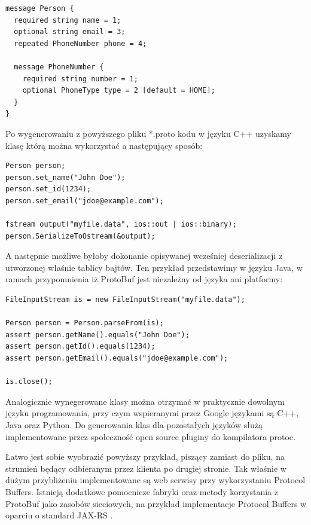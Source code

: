 \begin{lstlisting}[label={proto_simple_sam}]
message Person {
  required string name = 1;
  optional string email = 3;
  repeated PhoneNumber phone = 4;

  message PhoneNumber {
    required string number = 1;
    optional PhoneType type = 2 [default = HOME];
  }
}
\end{lstlisting}

Po wygenerowaniu z powyższego pliku *.proto kodu w języku C++ uzyskamy klasę którą można wykorzystać a następujący sposób:

\begin{lstlisting}[caption={Przykład klasy ProtoBuf w C++, serializowanej do pliku}]
Person person;
person.set_name("John Doe");
person.set_id(1234);
person.set_email("jdoe@example.com");

fstream output("myfile.data", ios::out | ios::binary);
person.SerializeToOstream(&output);
\end{lstlisting}

A następnie możliwe byłoby dokonanie opisywanej wcześniej deserializacji z utworzonej właśnie tablicy bajtów.
Ten przykład przedstawimy w języku Java, w ramach przypomnienia iż ProtoBuf jest niezależny od języka ani platformy:

\begin{lstlisting}[caption={Przykład klasy ProtoBuf w Javie, odczytującej ,,się'' z zapisanego wcześniej binarnego pliku}]
FileInputStream is = new FileInputStream("myfile.data");

Person person = Person.parseFrom(is);
assert person.getName().equals("John Doe");
assert person.getId().equals(1234);
assert person.getEmail().equals("jdoe@example.com");

is.close();
\end{lstlisting}

Analogicznie wynegerowane klasy można otrzymać w praktycznie dowolnym języku programowania, 
przy czym wspieranymi przez Google językami są C++, Java oraz Python. Do generowania klas dla pozostałych języków
służą implementowane przez społeczność open source pluginy do kompilatora protoc.

Łatwo jest sobie wyobrazić powyższy przykład, piszący zamiast do pliku, na strumień będący odbieranym przez klienta po drugiej stronie.
Tak właśnie w dużym przybliżeniu implementowane są web serwisy przy wykorzystaniu Protocol Buffers. Istnieją dodatkowe pomocnicze fabryki oraz metody
korzystania z ProtoBuf jako zasobów sieciowych, na przykład implementacje Protocol Buffers w oparciu o standard JAX-RS \cite{jaxrs}.


